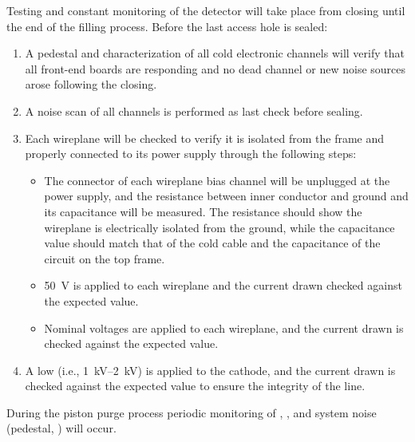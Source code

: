 Testing and constant monitoring of the detector will take place from  closing until the end of the filling process. 
Before the last %
access hole is sealed:
\begin{enumerate}

    \item A pedestal and  characterization of all cold electronic channels will verify that all  front-end boards are responding and no dead channel or new noise sources arose following the  closing.
    
    \item A noise scan of all  channels is performed as last check before sealing.

    \item Each  wireplane will be checked to verify it is isolated from the  frame and properly connected to its  power supply through the following steps:
    
\begin{itemize}

    \item The  connector of each wireplane bias channel will be unplugged at the power supply, and the resistance  between inner conductor and ground and its capacitance 
     will be measured. The resistance should show the wireplane is electrically isolated from the ground, while the capacitance value should match that of the cold  cable and the capacitance of the circuit on the  top frame.

    \item \SI{50}{V} is applied to each wireplane and the current drawn checked against the expected value.
    
    \item Nominal voltages are applied to each wireplane, and the current drawn is checked against the expected value. 
    
\end{itemize}

    \item A low  (i.e., \SIrange{1}{2}{kV}) is applied to the cathode, and the current drawn is checked against the expected value to ensure the integrity of the  line.

\end{enumerate}

During the piston purge process %
periodic monitoring of %
, , and  system noise (pedestal, ) will occur.

